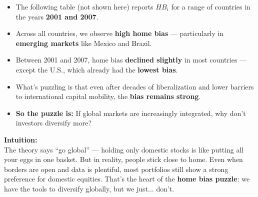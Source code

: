 \documentclass[12pt]{article}
\begin{document}
\begin{itemize}
\begin{itemize}
    \item The following table (not shown here) reports \( HB_i \) for a range of countries in the years \textbf{2001 and 2007}.

    \item Across all countries, we observe \textbf{high home bias} — particularly in \textbf{emerging markets} like Mexico and Brazil.

    \item Between 2001 and 2007, home bias \textbf{declined slightly} in most countries — except the U.S., which already had the \textbf{lowest bias}.

    \item What’s puzzling is that even after decades of liberalization and lower barriers to international capital mobility, the \textbf{bias remains strong}.

    \item \textbf{So the puzzle is:} If global markets are increasingly integrated, why don’t investors diversify more?
\end{itemize}

\vspace{1em}
\textbf{Intuition:} \\
The theory says “go global” — holding only domestic stocks is like putting all your eggs in one basket. But in reality, people stick close to home. Even when borders are open and data is plentiful, most portfolios still show a strong preference for domestic equities. That’s the heart of the \textbf{home bias puzzle}: we have the tools to diversify globally, but we just... don’t.


\end{itemize}
\end{document}
